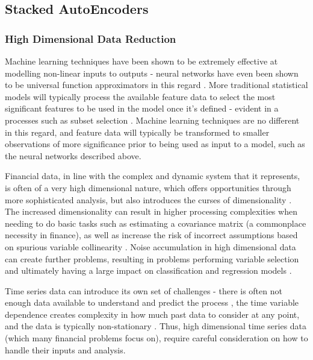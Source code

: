 \documentclass[a4paper,11pt,oneside]{article}
\theoremstyle{plain}
\theoremstyle{definition}
\begin{document}
	
	\subsection{Stacked AutoEncoders}\label{lr_SAE}
	
	\subsubsection{High Dimensional Data Reduction}\label{HDDR}
	
	Machine learning techniques have been shown to be extremely effective at modelling non-linear inputs 
	to outputs - neural networks have even been shown to be universal function approximators in this regard \citep{Hornik}. 
	More traditional statistical models will typically process the available feature data to select the most significant 
	features to be used in the model once it’s defined - evident in a processes such as subset selection \citep{Schaefer}. 
	Machine learning techniques are no different in this regard, and feature data will typically be transformed to smaller 
	observations of more significance prior to being used as input to a model, such as the neural networks described above.
	\hfill \break 
	
	Financial data, in line with the complex and dynamic system that it represents, is often of a very high dimensional 
	nature, which offers opportunities through more sophisticated analysis, but also introduces the curses of
	dimensionality \citep{Donoho}. The increased dimensionality can result in higher processing complexities when needing to 
	do basic tasks such as estimating a covariance matrix (a commonplace necessity in finance), as well as increase 
	the risk of incorrect assumptions based on spurious variable collinearity \citep{Fan1}. Noise accumulation in high 
	dimensional data can create further problems, resulting in problems performing variable selection and ultimately 
	having a large impact on classification and regression models \citep{Fan2}.
	\hfill \break 
	
	Time series data can introduce its own set of challenges - there is often not enough data available to understand 
	and predict the process \citep{Fama}, the time variable dependence creates complexity in how much past 
	data to consider at any point, and the data is typically non-stationary \citep{Langkvist}. Thus, high dimensional time 
	series data (which many financial problems focus on), require careful consideration on how to handle their inputs 
	and analysis.
	\hfill \break 
	
\end{document}
